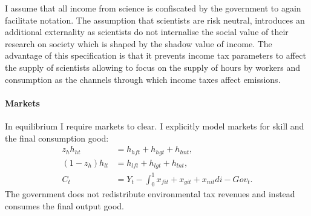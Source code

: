 I assume that all income from science is confiscated by the government to again facilitate notation. The assumption that scientists are risk neutral, introduces an additional externality as scientists do not internalise the social value of their research on society which is shaped by the shadow value of income. The advantage of this specification is that it prevents income tax parameters to affect the supply of scientists allowing to focus on the supply of hours by workers and consumption as the channels through which income taxes affect emissions. 
\begin{comment}
\paragraph{Impossibility of reaching target in laissez-faire with exogenous growth}
\tr{Note that this is wrong! There is an option for the gov to affect inflation which then redirects demand.}
Note that with exogenous growth in each sector there is no possibility for the government to stop emissions from growing, since production of the dirty good is essential for the consumption good (no perfect substitution: $\varepsilon<\infty$). To meet the emission target, the government either needs to affect the growth rate in the economy; i.e., $\upsilon_j$ is a choice variable, or work and consumption need to be set to zero; or the emission target has to be defined in relative terms. The latter possibility contradicts the Paris Agreement which is concerned with absolute emissions.  
I therefore assume, that the government can change the growth rate.

The government chooses the growth rate in each sector, taking into account that research is constrained by an exogenous  amount of scientists
\begin{align}
\upsilon_{ct}+\upsilon_{dt}\leq\Upsilon
\end{align}
\end{comment} 
  
\paragraph{Markets}
In equilibrium I require markets to clear. I explicitly model markets for skill and the final consumption good:
\begin{align}
z_h h_{ht}&=h_{hft}+h_{hgt}+h_{hnt},\\
(1-z_h) h_{lt}&=h_{lft}+h_{lgt}+h_{lnt},\\
C_t&=Y_t-\int_{0}^{1}x_{fit}+x_{git}+x_{nit}di-Gov_t.
\end{align}
The government does not redistribute environmental tax revenues and instead consumes the final output good. 
